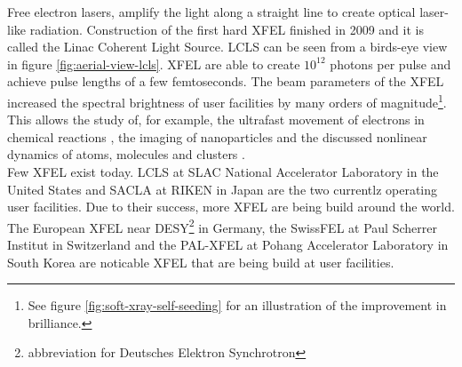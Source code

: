 Free electron lasers, amplify the light along a straight line to create optical laser-like radiation. Construction of the first hard XFEL finished in 2009 and it is called the Linac Coherent Light Source. LCLS can be seen from a birds-eye view in figure \ref{fig:aerial-view-lcls}. XFEL are able to create $10^{12}$ photons per pulse and achieve pulse lengths of a few femtoseconds. The beam parameters of the XFEL increased the spectral brightness of user facilities by many orders of magnitude\footnote{See figure \ref{fig:soft-xray-self-seeding} for an illustration of the improvement in brilliance.}. This allows the study of, for example, the ultrafast movement of electrons in chemical reactions \citep{Dell'Angela-2013-Science,Picon-2016-NatComm}, the imaging of nanoparticles \citep{Chapman-2011-Nature,Seibert-2011-Nature} and the discussed nonlinear dynamics of atoms, molecules and clusters \citep{Young-2010-Nature,Rohringer-2012-Nature,Berrah-2011-PNAS,Gorkhover-2012-PRL}.\\[1\baselineskip]
Few XFEL exist today. LCLS at SLAC National Accelerator Laboratory in the United States and SACLA at RIKEN in Japan are the two currentlz operating user facilities. Due to their success, more XFEL are being build around the world. The European XFEL near DESY\footnote{abbreviation for Deutsches Elektron Synchrotron} in Germany, the SwissFEL at Paul Scherrer Institut in Switzerland and the PAL-XFEL at Pohang Accelerator Laboratory in South Korea are noticable XFEL that are being build at user facilities.
%
%
%
